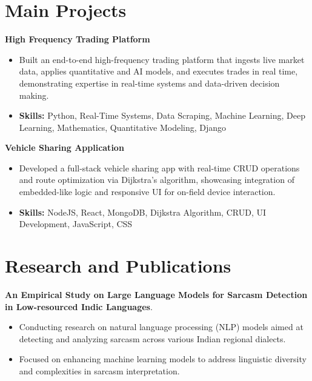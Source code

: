 \documentclass[a4paper,11pt]{article}
\begin{document}
\section{\textbf{Main Projects}}

\vspace{1mm}
  \textbf{High Frequency Trading Platform  }
\vspace{-1.5mm} %
\begin{itemize}
  \item Built an end-to-end high-frequency trading platform that ingests live market data, applies quantitative and AI models, and executes trades in real time, demonstrating expertise in real-time systems and data-driven decision making.
\vspace{-3mm}
  \item \textbf{Skills:} Python, Real-Time Systems, Data Scraping, Machine Learning, Deep Learning, Mathematics, Quantitative Modeling, Django
\end{itemize}


\vspace{1mm}
   \textbf{Vehicle Sharing Application }
\vspace{-1.5mm} %
\begin{itemize}
  \item Developed a full-stack vehicle sharing app with real-time CRUD operations and route optimization via Dijkstra's algorithm, showcasing integration of embedded-like logic and responsive UI for on-field device interaction.
\vspace{-3mm}
  \item \textbf{Skills:} NodeJS, React, MongoDB, Dijkstra Algorithm, CRUD, UI Development, JavaScript, CSS
\end{itemize}



\section{\textbf{Research and Publications} \hfill }
\vspace{1mm}
  \textbf{An Empirical Study on Large Language Models for Sarcasm Detection in Low-resourced Indic Languages}.
\vspace{-1mm} %
\begin{itemize}
  \item Conducting research on natural language processing (NLP) models aimed at detecting and analyzing sarcasm across various Indian regional dialects.
\vspace{-3mm}
  \item Focused on enhancing machine learning models to address linguistic diversity and complexities in sarcasm interpretation.
\end{itemize}
\end{document}
